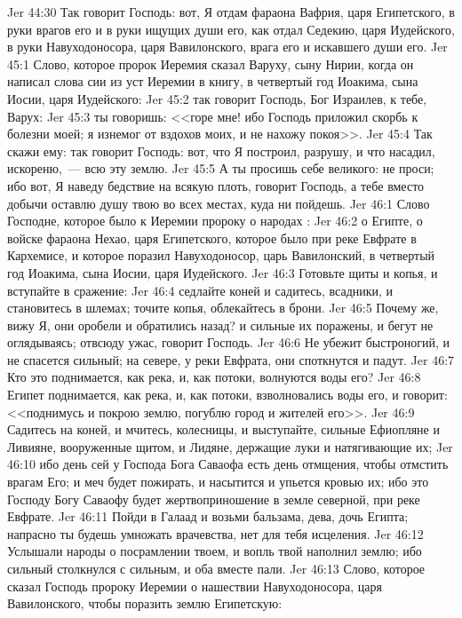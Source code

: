 \vs Jer 44:30 Так говорит Господь: вот, Я отдам фараона Вафрия, царя Египетского, в руки врагов его и в руки ищущих души его, как отдал Седекию, царя Иудейского, в руки Навуходоносора, царя Вавилонского, врага его и искавшего души его.
\vs Jer 45:1 Слово, которое пророк Иеремия сказал Варуху, сыну Нирии, когда он написал слова сии из уст Иеремии в книгу, в четвертый год Иоакима, сына Иосии, царя Иудейского:
\vs Jer 45:2 так говорит Господь, Бог Израилев, к тебе, Варух:
\vs Jer 45:3 ты говоришь: <<горе мне! ибо Господь приложил скорбь к болезни моей; я изнемог от вздохов моих, и не нахожу покоя>>.
\vs Jer 45:4 Так скажи ему: так говорит Господь: вот, что Я построил, разрушу, и что насадил, искореню,~--- всю эту землю.
\vs Jer 45:5 А ты просишь себе великого: не проси; ибо вот, Я наведу бедствие на всякую плоть, говорит Господь, а тебе вместо добычи оставлю душу твою во всех местах, куда ни пойдешь.
\vs Jer 46:1 Слово Господне, которое было к Иеремии пророку о народах :
\vs Jer 46:2 о Египте, о войске фараона Нехао, царя Египетского, которое было при реке Евфрате в Кархемисе, и которое поразил Навуходоносор, царь Вавилонский, в четвертый год Иоакима, сына Иосии, царя Иудейского.
\vs Jer 46:3 Готовьте щиты и копья, и вступайте в сражение:
\vs Jer 46:4 седлайте коней и садитесь, всадники, и становитесь в шлемах; точите копья, облекайтесь в брони.
\vs Jer 46:5 Почему же, вижу Я, они оробели и обратились назад? и сильные их поражены, и бегут не оглядываясь; отвсюду ужас, говорит Господь.
\vs Jer 46:6 Не убежит быстроногий, и не спасется сильный; на севере, у реки Евфрата, они споткнутся и падут.
\vs Jer 46:7 Кто это поднимается, как река, и, как потоки, волнуются воды его?
\vs Jer 46:8 Египет поднимается, как река, и, как потоки, взволновались воды его, и говорит: <<поднимусь и покрою землю, погублю город и жителей его>>.
\vs Jer 46:9 Садитесь на коней, и мчитесь, колесницы, и выступайте, сильные Ефиопляне и Ливияне, вооруженные щитом, и Лидяне, держащие луки и натягивающие их;
\vs Jer 46:10 ибо день сей у Господа Бога Саваофа есть день отмщения, чтобы отмстить врагам Его; и меч будет пожирать, и насытится и упьется кровью их; ибо это Господу Богу Саваофу будет жертвоприношение в земле северной, при реке Евфрате.
\vs Jer 46:11 Пойди в Галаад и возьми бальзама, дева, дочь Египта; напрасно ты будешь умножать врачевства, нет для тебя исцеления.
\vs Jer 46:12 Услышали народы о посрамлении твоем, и вопль твой наполнил землю; ибо сильный столкнулся с сильным, и оба вместе пали.
\rsbpar\vs Jer 46:13 Слово, которое сказал Господь пророку Иеремии о нашествии Навуходоносора, царя Вавилонского, чтобы поразить землю Египетскую:
